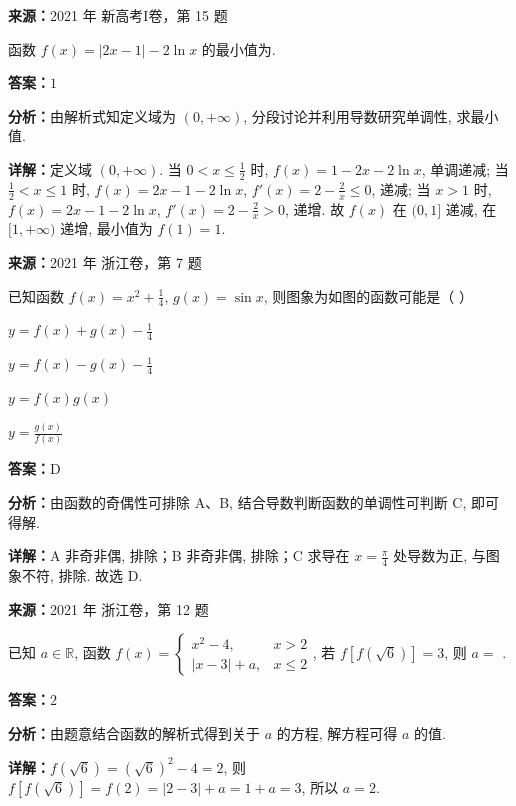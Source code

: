\begin{question}[points=5]
\textbf{来源：}2021 年 新高考I卷，第 15 题\par
函数 $f(x) = |2x - 1| - 2\ln x$ 的最小值为.
\fillin[{$1$}]
\begin{solution}
\textbf{答案：}$1$

\textbf{分析：}由解析式知定义域为 $(0, +\infty)$, 分段讨论并利用导数研究单调性, 求最小值.

\textbf{详解：}定义域 $(0, +\infty)$. 当 $0 < x \leq \frac{1}{2}$ 时, $f(x) = 1 - 2x - 2\ln x$, 单调递减; 当 $\frac{1}{2} < x \leq 1$ 时, $f(x) = 2x - 1 - 2\ln x$, $f'(x) = 2 - \frac{2}{x} \leq 0$, 递减; 当 $x > 1$ 时, $f(x) = 2x - 1 - 2\ln x$, $f'(x) = 2 - \frac{2}{x} > 0$, 递增. 故 $f(x)$ 在 $(0,1]$ 递减, 在 $[1, +\infty)$ 递增, 最小值为 $f(1) = 1$.
\end{solution}
\end{question}

\begin{question}[points=4]
\textbf{来源：}2021 年 浙江卷，第 7 题\par
已知函数 $f(x) = x^2 + \frac{1}{4}$, $g(x) = \sin x$, 则图象为如图的函数可能是（   ）
\begin{choices}
  \item $y = f(x) + g(x) - \frac{1}{4}$
  \item $y = f(x) - g(x) - \frac{1}{4}$
  \item $y = f(x)g(x)$
  \item $y = \frac{g(x)}{f(x)}$
\end{choices}
\begin{solution}
\textbf{答案：}D

\textbf{分析：}由函数的奇偶性可排除 A、B, 结合导数判断函数的单调性可判断 C, 即可得解.

\textbf{详解：}A 非奇非偶, 排除；B 非奇非偶, 排除；C 求导在 $x=\frac{\pi}{4}$ 处导数为正, 与图象不符, 排除. 故选 D.
\end{solution}
\end{question}

\begin{question}[points=4]
\textbf{来源：}2021 年 浙江卷，第 12 题\par
已知 $a\in\mathbb{R}$, 函数 $f(x)=\begin{cases} x^2-4, & x>2 \\ |x-3|+a, & x\leq 2 \end{cases}$, 若 $f[f(\sqrt{6})]=3$, 则 $a=$ .
\fillin[{$2$}]
\begin{solution}
\textbf{答案：}$2$

\textbf{分析：}由题意结合函数的解析式得到关于 $a$ 的方程, 解方程可得 $a$ 的值.

\textbf{详解：}$f(\sqrt{6}) = (\sqrt{6})^2-4=2$, 则 $f[f(\sqrt{6})]=f(2)=|2-3|+a=1+a=3$, 所以 $a=2$.
\end{solution}
\end{question}

